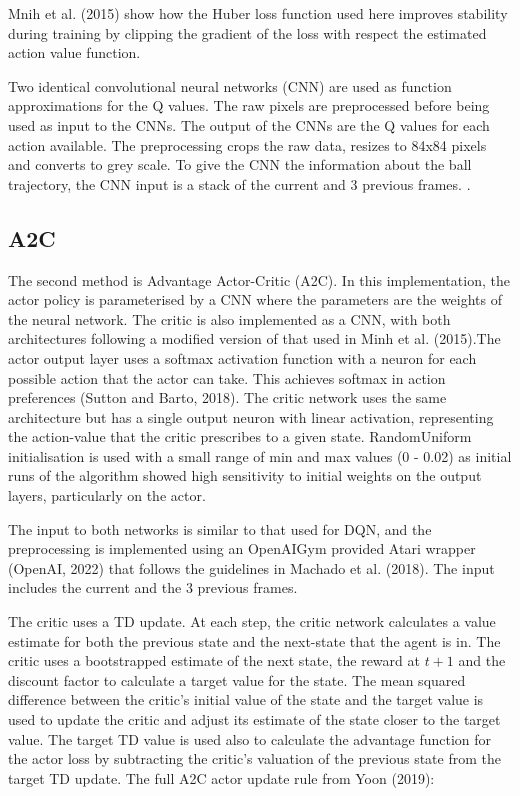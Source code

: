 \documentclass{article}
\begin{document}
Mnih et al. (2015) show how the Huber loss function used here improves stability during training by clipping the gradient of the loss with respect the estimated action value function.

Two identical convolutional neural networks (CNN) are used as function approximations for the Q values. The raw pixels  are preprocessed before being used as input to the CNNs. The output of the CNNs are the Q values for each action available.
The preprocessing crops the raw data, resizes to 84x84 pixels and converts to grey scale. To give the CNN the information about the ball trajectory, the CNN input is a stack of the current and 3 previous frames.
.

\subsection{A2C}

The second method is Advantage Actor-Critic (A2C). In this implementation, the actor policy is parameterised by a CNN where the parameters are the weights of the neural network. The critic is also implemented as a CNN, with both architectures following a modified version of that used in Minh et al. (2015).The actor output layer uses a softmax activation function with a neuron for each possible action that the actor can take. This achieves softmax in action preferences (Sutton and Barto, 2018). The critic network uses the same architecture but has a single output neuron with linear activation, representing the action-value that the critic prescribes to a given state. RandomUniform initialisation is used with a small range of min and max values (0 - 0.02) as initial runs of the algorithm showed high sensitivity to initial weights on the output layers, particularly on the actor.

The input to both networks is similar to that used for DQN, and the preprocessing is implemented using an OpenAIGym provided Atari wrapper (OpenAI, 2022) that follows the guidelines in Machado et al. (2018).  The input includes the current and the 3 previous frames.

The critic uses a TD update. At each step, the critic network calculates a value estimate for both the previous state and the next-state that the agent is in. The critic uses a bootstrapped estimate of the next state, the reward at $t+1$ and the discount factor to calculate a target value for the state. The mean squared difference between the critic's initial value of the state and the target value is used to update the critic and adjust its estimate of the state closer to the target value. The target TD value is used also to calculate the advantage function for the actor loss by subtracting the critic's valuation of the previous state from the target TD update. The full A2C actor update rule from Yoon (2019):
\end{document}
